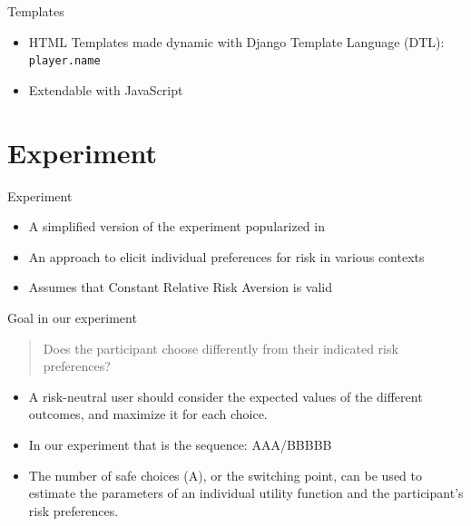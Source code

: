\documentclass[10pt]{beamer}
\begin{document}
\begin{frame}[fragile]{Templates}
  \begin{itemize}
    \item HTML Templates made dynamic with Django Template Language (DTL): \texttt{{{player.name}}}
    \item Extendable with JavaScript
  \end{itemize}
\end{frame}


\section{Experiment}

\begin{frame}{Experiment}

  \begin{itemize}
    \item A simplified version of the experiment popularized in \textcite{holt_risk_2002}
    \item An approach to elicit individual preferences for risk in various contexts
    \item Assumes that Constant Relative Risk Aversion is valid
  \end{itemize}
  
\end{frame}

\begin{frame}{Goal in our experiment}
  \begin{quote}
    Does the participant choose differently from their indicated risk preferences? 
  \end{quote}
\end{frame}

\begin{frame}
  \begin{itemize}
    \item A risk-neutral user should consider the expected values of the different outcomes, and maximize it for each choice. 
    \item In our experiment that is the sequence: AAA/BBBBB
    \item The number of safe choices (A), or the switching point, can be used to estimate the parameters of an individual utility function and the participant's risk preferences.
  \end{itemize}
\end{frame}

\begin{frame}
    \small
    
\end{frame}
\end{document}
